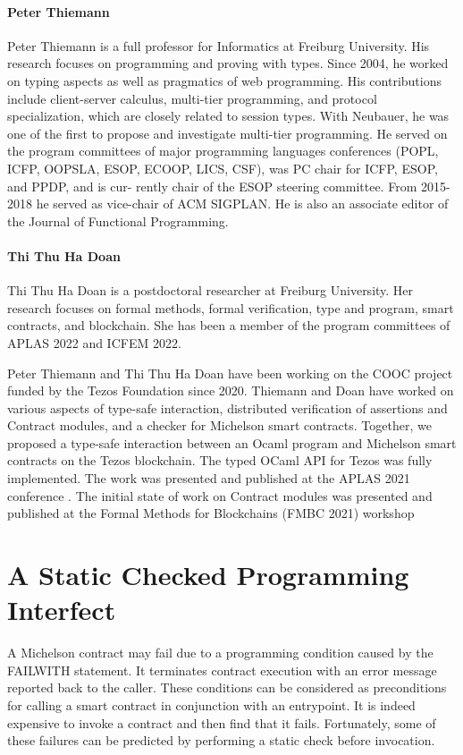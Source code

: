 \documentclass[a4paper,11pt]{article}
\begin{document}
\paragraph{Peter Thiemann}
Peter Thiemann is a full professor for Informatics at Freiburg University.
His research focuses on programming and proving with types. Since 2004, he worked on
typing aspects as well as pragmatics of web programming. His contributions include client-server calculus, multi-tier programming, and protocol specialization, which are closely related to session types. With Neubauer, he was one of the first to propose and investigate multi-tier
programming. He served on the program committees of major programming languages conferences (POPL,
ICFP, OOPSLA, ESOP, ECOOP, LICS, CSF), was PC chair for ICFP, ESOP, and PPDP, and is cur-
rently chair of the ESOP steering committee. From 2015-2018 he served as vice-chair of ACM
SIGPLAN. He is also an associate editor of the Journal of Functional Programming.


\paragraph{Thi Thu Ha Doan} Thi Thu Ha Doan is a postdoctoral researcher at Freiburg University. Her research focuses on formal methods, formal verification, type and program, smart contracts, and blockchain. She has been a member of the program committees of APLAS 2022 and ICFEM 2022. 

Peter Thiemann and Thi Thu Ha Doan have been working on the COOC project funded by the Tezos Foundation since 2020. Thiemann and Doan have worked on various aspects of type-safe interaction, distributed verification of assertions and Contract modules, and a checker for Michelson smart contracts. Together, we proposed a type-safe interaction between an Ocaml program and Michelson smart contracts on the Tezos blockchain. The typed OCaml API for Tezos was fully implemented. The work was presented and published at the APLAS 2021 conference \cite{DBLP:conf/fc/ThiemannAplas21}. The initial state of work on Contract modules was presented and published at the Formal Methods for Blockchains (FMBC 2021) workshop \cite{DBLP:conf/fc/ThiemannFmbc21}


\section{A Static Checked Programming Interfect}
\label{sec:checked-programming-interfect}
A Michelson contract may fail due to a programming condition caused by the FAILWITH statement. It terminates contract execution with an error message reported back to the caller. These conditions can be considered as preconditions for calling a smart contract in conjunction with an entrypoint. It is indeed expensive to invoke a contract and then find that it fails. Fortunately, some of these failures can be predicted by performing a static check before invocation.
\end{document}
